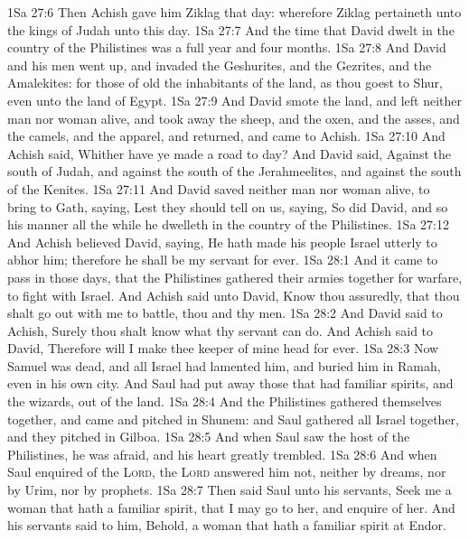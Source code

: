 \vs 1Sa 27:6 Then Achish gave him Ziklag that day: wherefore Ziklag pertaineth unto the kings of Judah unto this day.
\vs 1Sa 27:7 And the time that David dwelt in the country of the Philistines was a full year and four months.
\vs 1Sa 27:8 And David and his men went up, and invaded the Geshurites, and the Gezrites, and the Amalekites: for those  of old the inhabitants of the land, as thou goest to Shur, even unto the land of Egypt.
\vs 1Sa 27:9 And David smote the land, and left neither man nor woman alive, and took away the sheep, and the oxen, and the asses, and the camels, and the apparel, and returned, and came to Achish.
\vs 1Sa 27:10 And Achish said, Whither have ye made a road to day? And David said, Against the south of Judah, and against the south of the Jerahmeelites, and against the south of the Kenites.
\vs 1Sa 27:11 And David saved neither man nor woman alive, to bring  to Gath, saying, Lest they should tell on us, saying, So did David, and so  his manner all the while he dwelleth in the country of the Philistines.
\vs 1Sa 27:12 And Achish believed David, saying, He hath made his people Israel utterly to abhor him; therefore he shall be my servant for ever.
\vs 1Sa 28:1 And it came to pass in those days, that the Philistines gathered their armies together for warfare, to fight with Israel. And Achish said unto David, Know thou assuredly, that thou shalt go out with me to battle, thou and thy men.
\vs 1Sa 28:2 And David said to Achish, Surely thou shalt know what thy servant can do. And Achish said to David, Therefore will I make thee keeper of mine head for ever.
\vs 1Sa 28:3 Now Samuel was dead, and all Israel had lamented him, and buried him in Ramah, even in his own city. And Saul had put away those that had familiar spirits, and the wizards, out of the land.
\vs 1Sa 28:4 And the Philistines gathered themselves together, and came and pitched in Shunem: and Saul gathered all Israel together, and they pitched in Gilboa.
\vs 1Sa 28:5 And when Saul saw the host of the Philistines, he was afraid, and his heart greatly trembled.
\vs 1Sa 28:6 And when Saul enquired of the \textsc{Lord}, the \textsc{Lord} answered him not, neither by dreams, nor by Urim, nor by prophets.
\vs 1Sa 28:7 Then said Saul unto his servants, Seek me a woman that hath a familiar spirit, that I may go to her, and enquire of her. And his servants said to him, Behold,  a woman that hath a familiar spirit at Endor.
